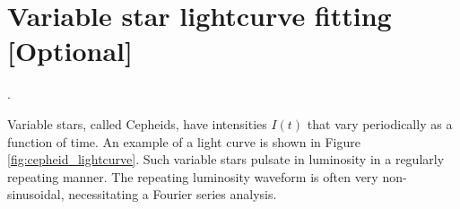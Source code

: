 
%    

\newpage
\section{Variable star lightcurve fitting [Optional]}
.

Variable stars, called Cepheids, have intensities $I(t)$ that vary
periodically as a function of time. An example of a light curve is
shown in Figure \ref{fig:cepheid_lightcurve}. Such variable stars
pulsate in luminosity in a regularly repeating manner. The repeating
luminosity waveform is often very non-sinusoidal, necessitating a
Fourier series analysis.

